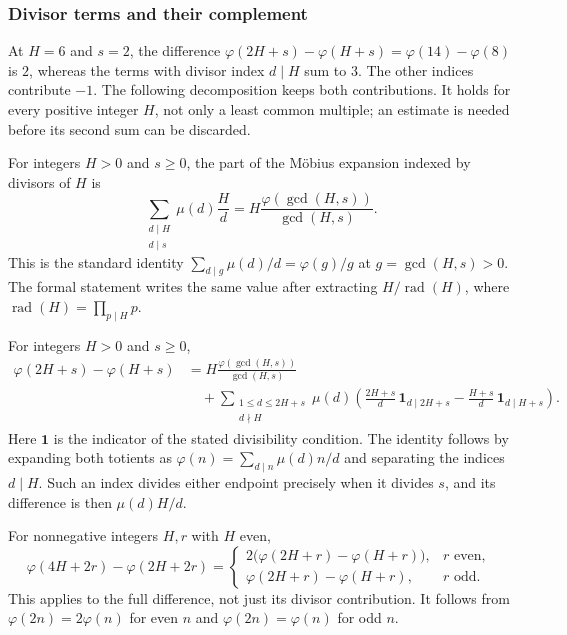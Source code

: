 \subsubsection{Divisor terms and their complement}

At $H=6$ and $s=2$, the difference
$\varphi(2H+s)-\varphi(H+s)=\varphi(14)-\varphi(8)$ is $2$, whereas
the terms with divisor index $d\mid H$ sum to $3$. The other indices
contribute $-1$. The following decomposition keeps both contributions.
It holds for every positive integer $H$, not only a least common multiple;
an estimate is needed before its second sum can be discarded.


\begin{prop}\label{prop:sum-over-divisor-indices}
For integers $H>0$ and $s\ge0$, the part of the M\"obius expansion
indexed by divisors of $H$ is
\[
 \sum_{\substack{d\mid H\\d\mid s}}\mu(d)\frac Hd
       =H\frac{\varphi(\gcd(H,s))}{\gcd(H,s)}.
\]
This is the standard identity
$\sum_{d\mid g}\mu(d)/d=\varphi(g)/g$ at $g=\gcd(H,s)>0$.
The formal statement writes the same value after extracting
$H/\operatorname{rad}(H)$, where
$\operatorname{rad}(H)=\prod_{p\mid H}p$.
\end{prop}

\begin{prop}\label{prop:divisor-sum-complement}
For integers $H>0$ and $s\ge0$,
\[
\begin{aligned}
 \varphi(2H+s)-\varphi(H+s)
 &=H\frac{\varphi(\gcd(H,s))}{\gcd(H,s)}\\
 &\quad+\sum_{\substack{1\le d\le2H+s\\d\nmid H}}
 \mu(d)\left(\frac{2H+s}{d}\,\mathbf1_{d\mid2H+s}
           -\frac{H+s}{d}\,\mathbf1_{d\mid H+s}\right).
\end{aligned}
\]
Here $\mathbf1$ is the indicator of the stated divisibility condition.
The identity follows by expanding both totients as
$\varphi(n)=\sum_{d\mid n}\mu(d)n/d$ and separating the indices
$d\mid H$. Such an index divides either endpoint precisely when it
divides $s$, and its difference is then $\mu(d)H/d$.
\end{prop}

\begin{thm}\label{thm:doubling-full-totient-difference}
For nonnegative integers $H,r$ with $H$ even,
\[
 \varphi(4H+2r)-\varphi(2H+2r)=
 \begin{cases}
 2\bigl(\varphi(2H+r)-\varphi(H+r)\bigr),&r\text{ even},\\
 \varphi(2H+r)-\varphi(H+r),&r\text{ odd}.
 \end{cases}
\]
This applies to the full difference, not just its divisor contribution.
It follows from $\varphi(2n)=2\varphi(n)$ for even $n$ and
$\varphi(2n)=\varphi(n)$ for odd $n$.
\end{thm}

